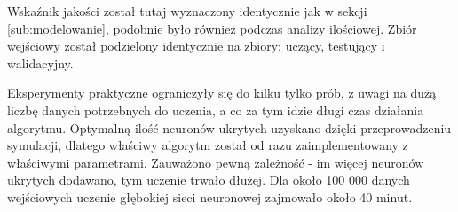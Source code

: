 Wskaźnik jakości został tutaj wyznaczony identycznie jak w sekcji \ref{sub:modelowanie}, podobnie było również podczas analizy ilościowej. Zbiór wejściowy został podzielony identycznie na zbiory: uczący, testujący i walidacyjny.


Eksperymenty praktyczne ograniczyły się do kilku tylko prób, z uwagi na dużą liczbę danych potrzebnych do uczenia, a co za tym idzie długi czas działania algorytmu. Optymalną ilość neuronów ukrytych uzyskano dzięki przeprowadzeniu symulacji, dlatego właściwy algorytm został od razu zaimplementowany z właściwymi parametrami. Zauważono pewną zależność - im więcej neuronów ukrytych dodawano, tym uczenie trwało dłużej. Dla około 100 000 danych wejściowych uczenie głębokiej sieci neuronowej zajmowało około 40 minut.